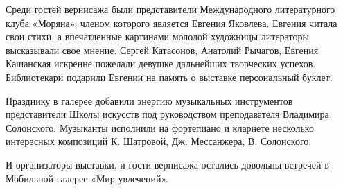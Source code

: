 Среди гостей вернисажа были представители Международного литературного клуба
«Моряна», членом которого является Евгения Яковлева. Евгения читала свои стихи,
а впечатленные картинами молодой художницы литераторы высказывали свое мнение.
Сергей Катасонов, Анатолий Рычагов, Евгения Кашанская искренне пожелали девушке
дальнейших творческих успехов. Библиотекари подарили Евгении на память о
выставке персональный буклет.

Празднику в галерее добавили энергию музыкальных инструментов представители
Школы искусств под руководством преподавателя Владимира Солонского. Музыканты
исполнили на фортепиано и кларнете несколько интересных композиций К. Шатровой,
Дж. Мессанжера, В. Солонского. 

И организаторы выставки, и гости вернисажа остались довольны встречей в
Мобильной галерее «Мир увлечений».
